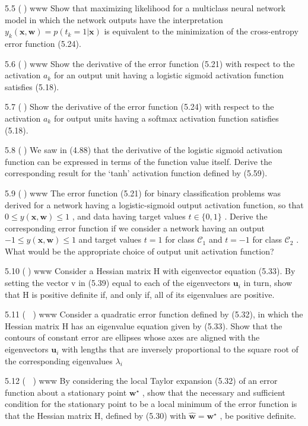 \documentclass[
  10
]{article}
\begin{document}
5.5 () www Show that maximizing likelihood for a multiclass neural
network model in which the network outputs have the interpretation
\(y _ { k } ( \mathbf { x } , \mathbf { w } ) = p ( t _ { k } = 1 | \mathbf { x } )\)
is equivalent to the minimization of the cross-entropy error function
(5.24).

5.6 () www Show the derivative of the error function (5.21) with respect
to the activation \(a _ { k }\) for an output unit having a logistic
sigmoid activation function satisfies (5.18).

5.7 () Show the derivative of the error function (5.24) with respect to
the activation \(a _ { k }\) for output units having a softmax
activation function satisfies (5.18).

5.8 () We saw in (4.88) that the derivative of the logistic sigmoid
activation function can be expressed in terms of the function value
itself. Derive the corresponding result for the `tanh' activation
function defined by (5.59).

5.9 () www The error function (5.21) for binary classification problems
was derived for a network having a logistic-sigmoid output activation
function, so that
\(0 \leqslant y ( \mathbf { x } , \mathbf { w } ) \leqslant 1\) , and
data having target values \(t \in \{ 0 , 1 \}\) . Derive the
corresponding error function if we consider a network having an output
\(- 1 \leqslant y ( \mathbf { x } , \mathbf { w } ) \leqslant 1\) and
target values \(t = 1\) for class \(\mathcal { C } _ { 1 }\) and
\(t = - 1\) for class \(\mathcal { C } _ { 2 }\) . What would be the
appropriate choice of output unit activation function?

5.10 () www Consider a Hessian matrix H with eigenvector equation
(5.33). By setting the vector v in (5.39) equal to each of the
eigenvectors \(\mathbf { u } _ { i }\) in turn, show that H is positive
definite if, and only if, all of its eigenvalues are positive.

5.11 ( ) www Consider a quadratic error function defined by (5.32), in
which the Hessian matrix H has an eigenvalue equation given by (5.33).
Show that the contours of constant error are ellipses whose axes are
aligned with the eigenvectors \(\mathbf { u } _ { i }\) with lengths
that are inversely proportional to the square root of the corresponding
eigenvalues \(\lambda _ { i }\)

5.12 ( ) www By considering the local Taylor expansion (5.32) of an
error function about a stationary point \(\mathbf { w } ^ { \star }\) ,
show that the necessary and sufficient condition for the stationary
point to be a local minimum of the error function is that the Hessian
matrix H, defined by (5.30) with
\(\widehat { \mathbf { w } } = \mathbf { w } ^ { \star }\) , be positive
definite.
\end{document}
